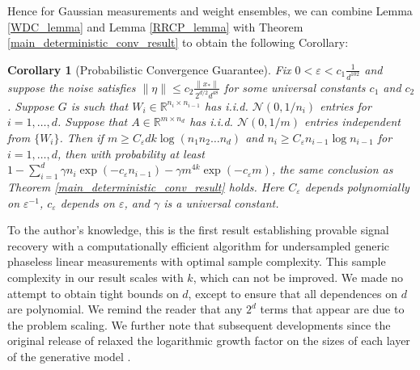 \documentclass[11pt]{article}
\renewcommand{\epsilon}{\varepsilon}
\newcommand{\R}{\mathbb{R}}
\newcommand{\G}{G}
\newtheorem{cor}[thm]{Corollary}
\theoremstyle{remark}
\begin{document}
Hence for Gaussian measurements and weight ensembles, we can combine Lemma \ref{WDC_lemma} and Lemma \ref{RRCP_lemma} with Theorem \ref{main_deterministic_conv_result} to obtain the following Corollary: 

\begin{cor}[Probabilistic Convergence Guarantee] \label{main_stochastic_conv_result}
Fix $0 < \epsilon < c_1\frac{1}{d^{102}}$ and suppose the noise satisfies $\|\eta\| \leqslant c_{2}\frac{\|x_*\|}{2^{d/2}d^{48}}$ for some universal constants $c_1$ and $c_2$. Suppose $\G$ is such that $W_i \in \R^{n_i \times n_{i-1}}$ has i.i.d. $\mathcal{N}(0,1/n_i)$ entries for $i = 1,\dots,d$. Suppose that $A \in \R^{m \times n_d}$ has i.i.d. $\mathcal{N}(0,1/m)$ entries independent from $\{W_i\}$. Then if $m \geqslant C_{\epsilon} dk \log (n_1n_2\dots n_d)$ and $n_i \geqslant C_{\epsilon} n_{i-1}\log n_{i-1}$ for $i =1,\dots,d$, then with probability at least $1 - \sum_{i=1}^d \gamma n_i\exp(-c_{\epsilon}n_{i-1}) - \gamma m^{4k} \exp(-c_{\epsilon} m)$, the same conclusion as Theorem \ref{main_deterministic_conv_result} holds. Here $C_{\epsilon}$ depends polynomially on $\epsilon^{-1}$, $c_{\epsilon}$ depends on $\epsilon$, and $\gamma$ is a universal constant.
\end{cor}


To the author's knowledge, this is the first result establishing provable signal recovery with a computationally efficient algorithm for undersampled generic phaseless linear measurements with optimal sample complexity. This sample complexity in our result scales with $k$, which can not be improved.  We made no attempt to obtain tight bounds on $d$, except to ensure that all dependences on $d$ are polynomial.  We remind the reader that any $2^d$ terms that appear are due to the problem scaling. We further note that subsequent developments since the original release of \cite{HLV18} relaxed the logarithmic growth factor on the sizes of each layer of the generative model \cite{Daskalaskisetal2020}.

\end{document}
